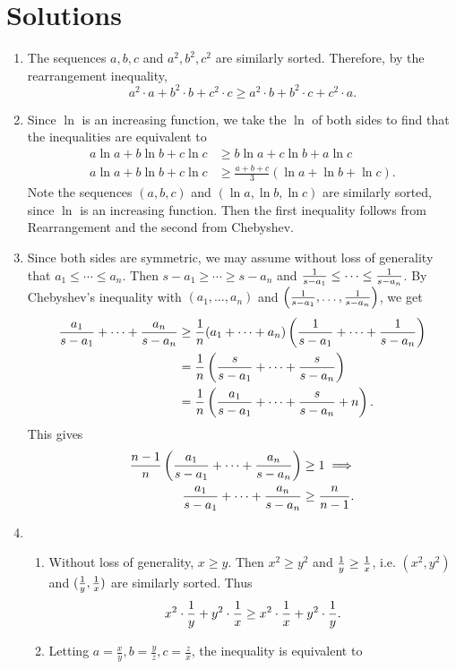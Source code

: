 \section{Solutions}
\begin{enumerate}
\item The sequences $a,b,c$ and $a^2, b^2, c^2$ are similarly sorted. Therefore, by the rearrangement inequality,
\[
a^2\cdot a+b^2\cdot b+c^2\cdot c\ge a^2\cdot b+b^2 \cdot c+c^2\cdot a.
\]
\item
Since $\ln$ is an increasing function, we take the $\ln$ of both sides to find that the inequalities are equivalent to
\begin{align*}
a\ln a+b\ln b+c\ln c&\ge b\ln a +c\ln b+ a\ln c\\
a\ln a+b\ln b+c\ln c&\ge \frac{a+b+c}{3}(\ln a+\ln b+\ln c).
\end{align*}
Note the sequences $(a,b,c)$ and $(\ln a, \ln b, \ln c)$ are similarly sorted, since $\ln$ is an increasing function. Then the first inequality follows from Rearrangement and the second from Chebyshev.
\item Since both sides are symmetric, we may assume without loss of generality that $a_1\le \cdots \le a_n$. Then $s-a_1\ge \cdots \ge s-a_n$ and $\frac{1}{s-a_1}\le \cdots \le \frac{1}{s-a_n}$. By Chebyshev's inequality with $(a_1,\ldots, a_n)$ and $\left( {\frac{1}{s-a_1}, \ldots , \frac{1}{s-a_n}} \right)$, we get
\begin{align*}
\frac{a_1}{s-a_1}+\cdots +\frac{a_n}{s-a_n}&\ge \frac{1}{n}(a_1+\cdots +a_n)\left( {\frac{1}{s-a_1}+\cdots +\frac{1}{s-a_n}} \right)\\
&= \frac{1}{n}\left( {\frac{s}{s-a_1}+\cdots +\frac{s}{s-a_n}} \right)\\
&= \frac{1}{n}\left( {\frac{a_1}{s-a_1}+\cdots +\frac{s}{s-a_n}+n} \right).
\end{align*}
This gives
\begin{align*}
\frac{n-1}{n}\left( {\frac{a_1}{s-a_1}+\cdots +\frac{a_n}{s-a_n}} \right)&\ge 1\implies\\
\frac{a_1}{s-a_1}+\cdots +\frac{a_n}{s-a_n}&\ge\frac{n}{n-1}.
\end{align*}
\item
\begin{enumerate}
\item Without loss of generality, $x\ge y$. Then $x^2\ge y^2$ and $\frac{1}{y}\ge \frac{1}{x}$, i.e. $(x^2,y^2)$ and $(\frac{1}{y},\frac{1}{x})$ are similarly sorted. Thus
\[
x^2\cdot \frac{1}{y}+y^2\cdot \frac{1}{x} \ge x^2\cdot \frac{1}{x} +y^2 \cdot \frac{1}{y}.
\]
\item Letting $a=\frac{x}{y}, b=\frac{y}{z}, c=\frac{z}{x}$, the inequality is equivalent to

\end{enumerate}
\end{enumerate}
